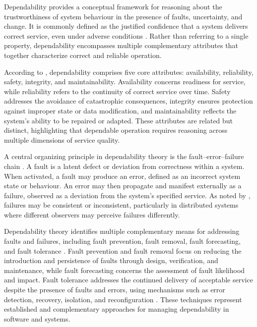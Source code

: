 Dependability provides a conceptual framework for reasoning about the trustworthiness of system behaviour in the presence of faults, uncertainty, and change. It is commonly defined as the justified confidence that a system delivers correct service, even under adverse conditions \cite{avizienis2004basic}. Rather than referring to a single property, dependability encompasses multiple complementary attributes that together characterize correct and reliable operation.

According to \citet{avizienis2004basic}, dependability comprises five core attributes: availability, reliability, safety, integrity, and maintainability. Availability concerns readiness for service, while reliability refers to the continuity of correct service over time. Safety addresses the avoidance of catastrophic consequences, integrity ensures protection against improper state or data modification, and maintainability reflects the system’s ability to be repaired or adapted. These attributes are related but distinct, highlighting that dependable operation requires reasoning across multiple dimensions of service quality.

A central organizing principle in dependability theory is the fault--error--failure chain \cite{avizienis2004basic}. A fault is a latent defect or deviation from correctness within a system. When activated, a fault may produce an error, defined as an incorrect system state or behaviour. An error may then propagate and manifest externally as a failure, observed as a deviation from the system’s specified service. As noted by \citet{hanmer2013patterns}, failures may be consistent or inconsistent, particularly in distributed systems where different observers may perceive failures differently.

Dependability theory identifies multiple complementary means for addressing faults and failures, including fault prevention, fault removal, fault forecasting, and fault tolerance \cite{avizienis2004basic}. Fault prevention and fault removal focus on reducing the introduction and persistence of faults through design, verification, and maintenance, while fault forecasting concerns the assessment of fault likelihood and impact. Fault tolerance addresses the continued delivery of acceptable service despite the presence of faults and errors, using mechanisms such as error detection, recovery, isolation, and reconfiguration \cite{hanmer2013patterns}. These techniques represent established and complementary approaches for managing dependability in software and systems.
